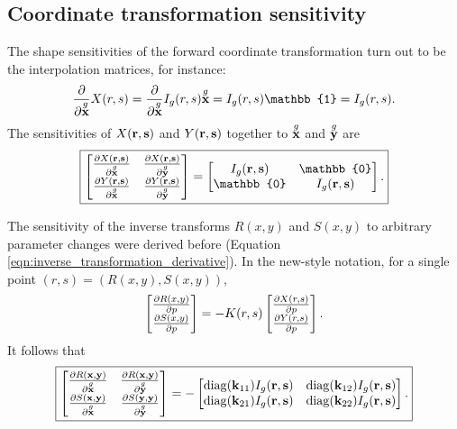 \subsection{Coordinate transformation sensitivity}
The shape sensitivities of the forward coordinate transformation turn out to be the interpolation matrices, for instance:
%
\begin{equation}
\pp{}{\g{\ve x}}X(r,s) = \pp{}{\g{\ve x}}I_g(r,s) \g{\ve x} = I_g(r,s) \mathbb{1} = I_g(r,s).
\end{equation}
%
The sensitivities of $X(\textbf{r}, \textbf{s})$ and $Y(\textbf{r}, \textbf{s})$ together to $\overset{g}{\textbf{x}}$ and $\overset{g}{\textbf{y}}$ are
%
\begin{equation}
\boxed{
\begin{bmatrix}
\pp{X(\ve r,\ve s)}{\g{\ve x}} & \pp{X(\ve r,\ve s)}{\g{\ve y}} \\
\pp{Y(\ve r,\ve s)}{\g{\ve x}} & \pp{Y(\ve r,\ve s)}{\g{\ve y}}
\end{bmatrix}
=
\begin{bmatrix}
I_g(\ve r,\ve s) & \mathbb{0} \\
\mathbb{0} & I_g(\ve r,\ve s)
\end{bmatrix}.
}%
\end{equation}

The sensitivity of the inverse transforms $R(x,y)$ and $S(x,y)$ to arbitrary parameter changes were derived before (Equation \ref{eqn:inverse_transformation_derivative}).  In the new-style notation, for a single point $(r,s) = (R(x,y), S(x,y))$,
%
\begin{equation}
\begin{bmatrix} \frac{\partial{R(x,y)}}{\partial{p}} \\ \frac{\partial{S(x,y)}}{\partial{p}} \end{bmatrix}
=
-K(r,s)
\begin{bmatrix}
\frac{\partial{X(r,s)}}{\partial{p}} \\ \frac{\partial{Y(r,s)}}{\partial{p}}
\end{bmatrix}.
\end{equation}
%
It follows that
%
\begin{equation}
\boxed{
\begin{bmatrix}
\pp{R(\ve x,\ve y)}{\g{\ve x}} & \pp{R(\ve x,\ve y)}{\g{\ve y}} \\
\pp{S(\ve x,\ve y)}{\g{\ve x}} & \pp{S(\ve y,\ve y)}{\g{\ve y}}
\end{bmatrix}
=
-\begin{bmatrix}
\operatorname{diag}(\ve{k}_{11}) I_g(\ve r, \ve s) & \operatorname{diag}(\ve{k}_{12}) I_g(\ve r, \ve s) \\
\operatorname{diag}(\ve{k}_{21}) I_g(\ve r, \ve s) & \operatorname{diag}(\ve{k}_{22}) I_g(\ve r, \ve s)
\end{bmatrix}.
}%
\end{equation}












